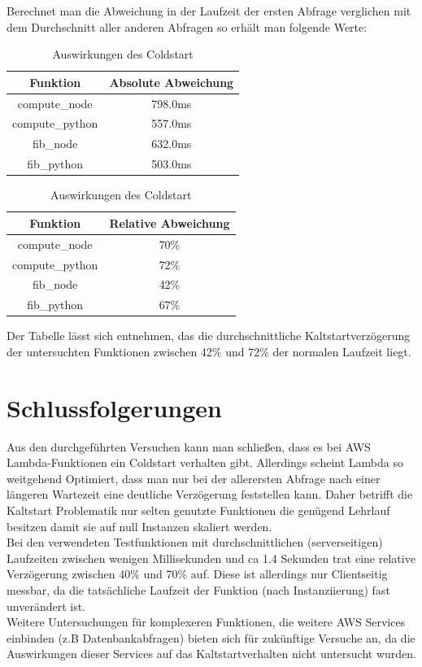 \documentclass[12pt,a4paper,parskip=half]{scrreprt}
\begin{document}
Berechnet man die Abweichung in der Laufzeit der ersten Abfrage verglichen mit dem Durchschnitt aller anderen Abfragen so erhält man folgende Werte:
\\
\begin{table}[h!]
	\centering
	\begin{tabular}{||c c||} 
		\hline
		Funktion & Absolute Abweichung \\ [0.5ex] 
		\hline\hline
		compute\_node & 798.0ms \\
		compute\_python & 557.0ms \\
		fib\_node & 632.0ms \\
		fib\_python & 503.0ms \\ [1ex] 
		\hline
	\end{tabular}

	\vspace{1cm}

	\begin{tabular}{||c c||} 
		\hline
		Funktion & Relative Abweichung \\ [0.5ex] 
		\hline\hline
		compute\_node & 70\% \\
		compute\_python & 72\% \\
		fib\_node & 42\% \\
		fib\_python & 67\% \\ [1ex] 
		\hline
	\end{tabular}
	\caption{Auswirkungen des Coldstart}
	\label{table:2}
\end{table}

Der Tabelle lässt sich entnehmen, das die durchschnittliche Kaltstartverzögerung der untersuchten Funktionen zwischen 42\% und 72\% der normalen Laufzeit liegt.


\newpage
\section{Schlussfolgerungen}

Aus den durchgeführten Versuchen kann man schließen, dass es bei AWS Lambda-Funktionen ein Coldstart verhalten gibt. Allerdings scheint Lambda so weitgehend Optimiert, dass man nur bei der allerersten Abfrage nach einer längeren Wartezeit eine deutliche Verzögerung feststellen kann. Daher betrifft die Kaltstart Problematik nur selten genutzte Funktionen die genügend Lehrlauf besitzen damit sie auf null Instanzen skaliert werden.
\\
Bei den verwendeten Testfunktionen mit durchschnittlichen (serverseitigen) Laufzeiten zwischen wenigen Millisekunden und ca 1.4 Sekunden trat eine relative Verzögerung zwischen 40\% und 70\% auf. Diese ist allerdings nur Clientseitig messbar, da die tatsächliche Laufzeit der Funktion (nach Instanziierung) fast unverändert ist.
\\
Weitere Untersuchungen für komplexeren Funktionen, die weitere AWS Services einbinden (z.B Datenbankabfragen) bieten sich für zukünftige Versuche an, da die Auswirkungen dieser Services auf das Kaltstartverhalten nicht untersucht wurden.
 


\newpage

\nocite{*}
\thispagestyle{headings}


 
\end{document}
